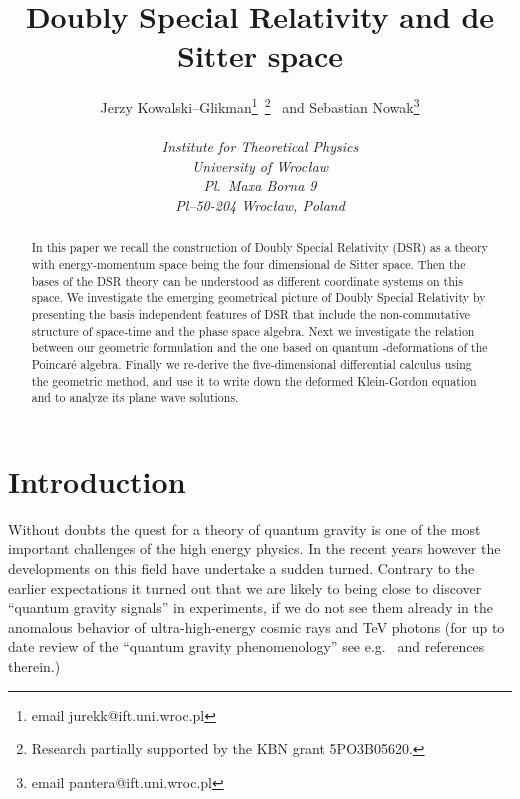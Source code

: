 \documentclass  [12pt] {article}
\begin{document}
\title{%
Doubly Special Relativity  and de Sitter space }
\author{ Jerzy {Kowalski--Glikman}\thanks{email jurekk@ift.uni.wroc.pl}~\thanks{Research  partially supported
by the    KBN grant 5PO3B05620.}~ and Sebastian Nowak\thanks{email
pantera@ift.uni.wroc.pl}\\  \\ {\em Institute for Theoretical
Physics}\\ {\em University of Wroc\l{}aw}\\ {\em Pl.\ Maxa Borna 9}\\
{\em Pl--50-204 Wroc\l{}aw, Poland}} \maketitle

\begin{abstract}
In this paper we recall the construction of Doubly Special Relativity (DSR)  as
a theory with energy-momentum space being the four dimensional de Sitter space.
Then the bases  of the DSR theory  can be understood as different coordinate
systems on this space. We investigate the emerging geometrical picture of
Doubly Special Relativity by presenting the basis independent features of DSR
that include the non-commutative structure of space-time and the  phase space
algebra. Next we investigate the relation between our geometric formulation and
the one based on quantum  \myHighlight{$\kappa$}\coordHE{}-deformations of the Poincar\'e algebra.
Finally we re-derive the five-dimensional differential calculus using the
geometric method, and use it to write down the deformed Klein-Gordon equation
and to analyze its plane wave solutions.
\end{abstract}



\section{Introduction}

Without doubts the quest for a theory of quantum gravity is one of the most
important  challenges of the high energy physics. In the recent years however
the developments on this field have undertake a sudden turned. Contrary to the
earlier expectations it turned out that we are likely to being close to
discover ``quantum gravity signals'' in experiments, if we do not see them
already in the anomalous behavior of ultra-high-energy cosmic rays and TeV
photons (for up to date review of the ``quantum gravity phenomenology'' see
e.g.~\cite{Amelino-Camelia:2002vw} and references therein.)
\end{document}
